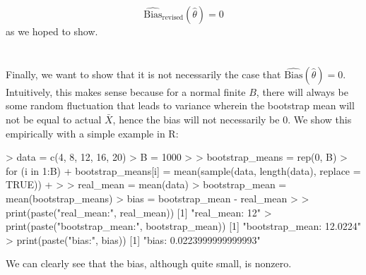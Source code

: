 \documentclass{article}
\begin{document}
{\[\]
\[
  \hat{\text{Bias}}_{\text{revised}}(\hat{\theta}) = 0
\]
as we hoped to show. \\ \\ \\ 
Finally, we want to show that it is not necessarily the case that \(\hat{\text{Bias}}(\hat{\theta}) = 0\). Intuitively, this makes sense because for a normal finite \(B\), there will always be some random fluctuation that leads to variance wherein the bootstrap mean will not be equal to actual \(\bar{X}\), hence the bias will not necessarily be 0. We show this empirically with a simple example in R:
\begin{spverbatim}
> data = c(4, 8, 12, 16, 20)
> B = 1000
> 
> bootstrap_means = rep(0, B)
> for (i in 1:B) {
+   bootstrap_means[i] = mean(sample(data, length(data), replace = TRUE))
+ }
> 
> real_mean = mean(data)
> bootstrap_mean = mean(bootstrap_means)
> bias = bootstrap_mean - real_mean
> 
> print(paste("real_mean:", real_mean))
[1] "real_mean: 12"
> print(paste("bootstrap_mean:", bootstrap_mean))
[1] "bootstrap_mean: 12.0224"
> print(paste("bias:", bias))
[1] "bias: 0.0223999999999993"
\end{spverbatim}
We can clearly see that the bias, although quite small, is nonzero.

}
\end{document}
